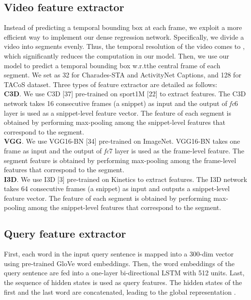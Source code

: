 \documentclass[10pt,twocolumn,letterpaper]{article}
\def\wrt{w.r.t\onedot} \def\dof{d.o.f\onedot}
\begin{document}
\subsection{Video feature extractor}

Instead of predicting a temporal bounding box at each frame, we exploit a more efficient way to implement our dense regression network. Specifically, we divide a video into  segments evenly. Thus, the temporal resolution of the video comes to , which significantly reduces the computation in our model. 
Then, we use our model to predict a temporal bounding box \wrt the central frame of each segment.
We set  as 32 for Charades-STA and ActivityNet Captions, and 128 for TACoS dataset. Three types of feature extractor are detailed as follows: \\
\noindent \textbf{C3D}. We use C3D [37] pre-trained on sport1M [22] to extract features. The C3D network takes 16 consecutive frames (a snippet) as input and the output of \textit{fc}6 layer is used as a snippet-level feature vector. The feature of each segment is obtained by performing max-pooling among the snippet-level features that correspond to the segment.\\
\noindent \textbf{VGG}.
We use VGG16-BN [34] pre-trained on ImageNet. VGG16-BN takes one frame as input and the output of \textit{fc}7 layer is used as the frame-level feature.
The segment feature is obtained by performing max-pooling among the frame-level features that correspond to the segment.\\
\noindent \textbf{I3D}.
We use I3D [3] pre-trained on Kinetics to extract features. The I3D network takes 64 consecutive frames (a snippet) as input and outputs a snippet-level feature vector. The feature of each segment is obtained by performing max-pooling among the snippet-level features that correspond to the segment.





\subsection{Query feature extractor}

First, each word in the input query sentence is mapped into a 300-dim vector using pre-trained GloVe word embeddings. Then, the word embeddings of the query sentence are fed into a one-layer bi-directional LSTM with 512 units. Last, the sequence of hidden states is used as query features. The hidden states of the first and the last word are concatenated, leading to the global representation .
\end{document}
